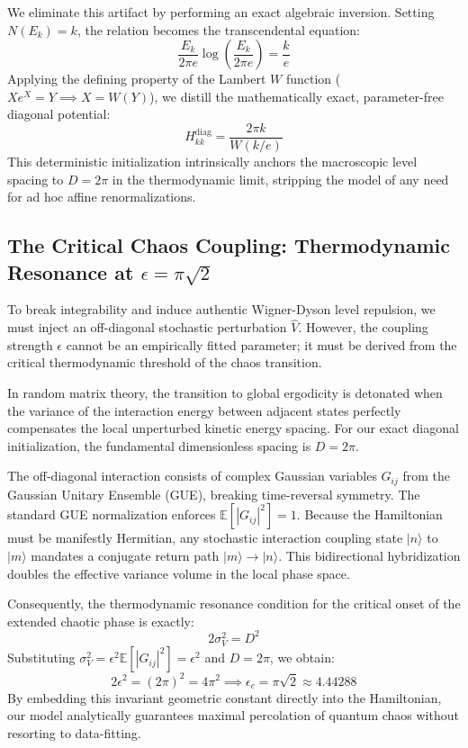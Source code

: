 \documentclass[aps,prl,preprint,superscriptaddress,floatfix]{revtex4-2}
\begin{document}
We eliminate this artifact by performing an exact algebraic inversion. Setting $N(E_k) = k$, the relation becomes the transcendental equation:
\begin{equation}
\frac{E_k}{2\pi e} \log\left(\frac{E_k}{2\pi e}\right) = \frac{k}{e}
\end{equation}
Applying the defining property of the Lambert $W$ function ($X e^X = Y \implies X = W(Y)$), we distill the mathematically exact, parameter-free diagonal potential:
\begin{equation}
\boxed{ H_{kk}^{\text{diag}} = \frac{2\pi k}{W(k/e)} }
\end{equation}
This deterministic initialization intrinsically anchors the macroscopic level spacing to $D = 2\pi$ in the thermodynamic limit, stripping the model of any need for ad hoc affine renormalizations.

\subsection{The Critical Chaos Coupling: Thermodynamic Resonance at \texorpdfstring{$\epsilon = \pi \sqrt{2}$}{epsilon = pi sqrt(2)}}

To break integrability and induce authentic Wigner-Dyson level repulsion, we must inject an off-diagonal stochastic perturbation $\hat{V}$. However, the coupling strength $\epsilon$ cannot be an empirically fitted parameter; it must be derived from the critical thermodynamic threshold of the chaos transition.

In random matrix theory, the transition to global ergodicity is detonated when the variance of the interaction energy between adjacent states perfectly compensates the local unperturbed kinetic energy spacing. For our exact diagonal initialization, the fundamental dimensionless spacing is $D = 2\pi$.

The off-diagonal interaction consists of complex Gaussian variables $G_{ij}$ from the Gaussian Unitary Ensemble (GUE), breaking time-reversal symmetry. The standard GUE normalization enforces $\mathbb{E}[|G_{ij}|^2] = 1$. Because the Hamiltonian must be manifestly Hermitian, any stochastic interaction coupling state $|n\rangle$ to $|m\rangle$ mandates a conjugate return path $|m\rangle \to |n\rangle$. This bidirectional hybridization doubles the effective variance volume in the local phase space. 

Consequently, the thermodynamic resonance condition for the critical onset of the extended chaotic phase is exactly:
\begin{equation}
2 \sigma_V^2 = D^2
\end{equation}
Substituting $\sigma_V^2 = \epsilon^2 \mathbb{E}[|G_{ij}|^2] = \epsilon^2$ and $D = 2\pi$, we obtain:
\begin{equation}
2 \epsilon^2 = (2\pi)^2 = 4\pi^2 \implies \boxed{ \epsilon_c = \pi \sqrt{2} \approx 4.44288 }
\end{equation}
By embedding this invariant geometric constant directly into the Hamiltonian, our model analytically guarantees maximal percolation of quantum chaos without resorting to data-fitting.
\end{document}
